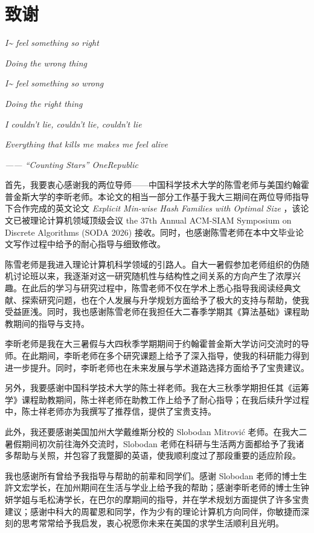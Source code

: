 \section*{致谢}

\textit{I\~{} feel something so right}

\textit{Doing the wrong thing}

\textit{I\~{} feel something so wrong}

\textit{Doing the right thing}

\textit{I couldn't lie, couldn't lie, couldn't lie}

\textit{Everything that kills me makes me feel alive}

\hfill \textit{------ ``Counting Stars'' OneRepublic}

\medskip

首先，我要衷心感谢我的两位导师——中国科学技术大学的陈雪老师与美国约翰霍普金斯大学的李昕老师。本论文的相当一部分工作基于我大三期间在两位导师指导下合作完成的英文论文 \textit{Explicit Min-wise Hash Families with Optimal Size} \cite{xue_shengtang_xin_min_wise}，该论文已被理论计算机领域顶级会议 the 37th Annual ACM-SIAM Symposium on Discrete Algorithms (SODA 2026) 接收。同时，也感谢陈雪老师在本中文毕业论文写作过程中给予的耐心指导与细致修改。

陈雪老师是我进入理论计算机科学领域的引路人。自大一暑假参加老师组织的伪随机讨论班以来，我逐渐对这一研究随机性与结构性之间关系的方向产生了浓厚兴趣。在此后的学习与研究过程中，陈雪老师不仅在学术上悉心指导我阅读经典文献、探索研究问题，也在个人发展与升学规划方面给予了极大的支持与帮助，使我受益匪浅。同时，我也感谢陈雪老师在我担任大二春季学期其《算法基础》课程助教期间的指导与支持。

李昕老师是我在大三暑假与大四秋季学期期间于约翰霍普金斯大学访问交流时的导师。在此期间，李昕老师在多个研究课题上给予了深入指导，使我的科研能力得到进一步提升。同时，李昕老师也在未来发展与学术道路选择方面给予了宝贵建议。

另外，我要感谢中国科学技术大学的陈士祥老师。我在大三秋季学期担任其《运筹学》课程助教期间，陈士祥老师在助教工作上给予了耐心指导；在我后续升学过程中，陈士祥老师亦为我撰写了推荐信，提供了宝贵支持。

此外，我还要感谢美国加州大学戴维斯分校的 Slobodan Mitrovi\'{c} 老师。在我大二暑假期间初次前往海外交流时，Slobodan 老师在科研与生活两方面都给予了我诸多帮助与关照，并包容了我蹩脚的英语，使我顺利度过了那段重要的适应阶段。

我也感谢所有曾给予我指导与帮助的前辈和同学们。感谢 Slobodan 老师的博士生許文宏学长，在加州期间在生活与学业上给予我的帮助；感谢李昕老师的博士生钟妍学姐与毛松涛学长，在巴尔的摩期间的指导，并在学术规划方面提供了许多宝贵建议；感谢中科大的周翟恩和同学，作为少有的理论计算机方向同伴，你敏捷而深刻的思考常常给予我启发，衷心祝愿你未来在美国的求学生活顺利且光明。

